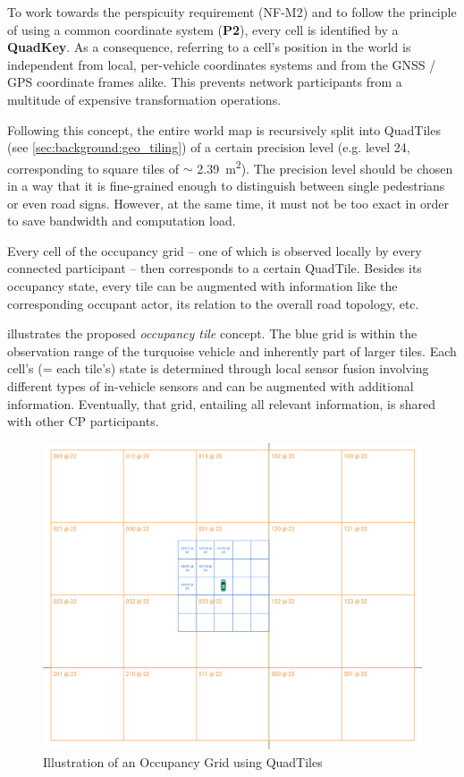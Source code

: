 To work towards the perspicuity requirement (NF-M2) and to follow the principle of using a common coordinate system (\textbf{P2}), every cell is identified by a \textbf{QuadKey}. As a consequence, referring to a cell's position in the world is independent from local, per-vehicle coordinates systems and from the GNSS / GPS coordinate frames alike. This prevents network participants from a multitude of expensive transformation operations.

Following this concept, the entire world map is recursively split into QuadTiles (see \cref{sec:background:geo_tiling}) of a certain precision level (e.g. level 24, corresponding to square tiles of $\sim$ \SI{2.39}{\square\meter}). The precision level should be chosen in a way that it is fine-grained enough to distinguish between single pedestrians or even road signs. However, at the same time, it must not be too exact in order to save bandwidth and computation load.

Every cell of the occupancy grid – one of which is observed locally by every connected participant – then corresponds to a certain QuadTile. Besides its occupancy state, every tile can be augmented with information like the corresponding occupant actor, its relation to the overall road topology, etc. 

 illustrates the proposed \textit{occupancy tile} concept. The blue grid is within the observation range of the turquoise vehicle and inherently part of larger tiles. Each cell's (= each tile's) state is determined through local sensor fusion involving different types of in-vehicle sensors and can be augmented with additional information. Eventually, that grid, entailing all relevant information, is shared with other CP participants.

\begin{figure}[h]
	\centering
	\includegraphics[width=1.0\linewidth]{98_images/geo_subscription_schema_1}
	\caption{Illustration of an Occupancy Grid using QuadTiles}
	\label{fig:tiling1}
\end{figure}


